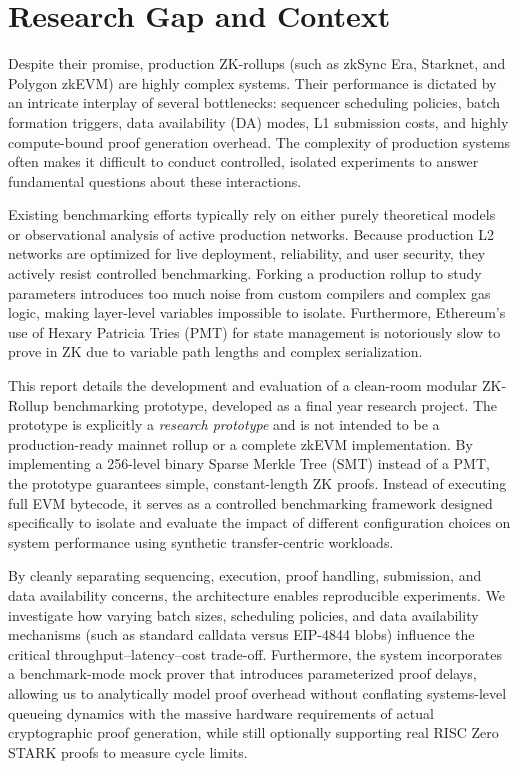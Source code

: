 \section{Research Gap and Context}
\label{sec:research_gap}

Despite their promise, production ZK-rollups (such as zkSync Era, Starknet, and Polygon zkEVM) are highly complex systems. Their performance is dictated by an intricate interplay of several bottlenecks: sequencer scheduling policies, batch formation triggers, data availability (DA) modes, L1 submission costs, and highly compute-bound proof generation overhead. The complexity of production systems often makes it difficult to conduct controlled, isolated experiments to answer fundamental questions about these interactions. 

Existing benchmarking efforts typically rely on either purely theoretical models or observational analysis of active production networks. Because production L2 networks are optimized for live deployment, reliability, and user security, they actively resist controlled benchmarking. Forking a production rollup to study parameters introduces too much noise from custom compilers and complex gas logic, making layer-level variables impossible to isolate. Furthermore, Ethereum's use of Hexary Patricia Tries (PMT) for state management is notoriously slow to prove in ZK due to variable path lengths and complex serialization. 

This report details the development and evaluation of a clean-room modular ZK-Rollup benchmarking prototype, developed as a final year research project. The prototype is explicitly a \textit{research prototype} and is not intended to be a production-ready mainnet rollup or a complete zkEVM implementation. By implementing a 256-level binary Sparse Merkle Tree (SMT) instead of a PMT, the prototype guarantees simple, constant-length ZK proofs. Instead of executing full EVM bytecode, it serves as a controlled benchmarking framework designed specifically to isolate and evaluate the impact of different configuration choices on system performance using synthetic transfer-centric workloads.

By cleanly separating sequencing, execution, proof handling, submission, and data availability concerns, the architecture enables reproducible experiments. We investigate how varying batch sizes, scheduling policies, and data availability mechanisms (such as standard calldata versus EIP-4844 blobs) influence the critical throughput--latency--cost trade-off. Furthermore, the system incorporates a benchmark-mode mock prover that introduces parameterized proof delays, allowing us to analytically model proof overhead without conflating systems-level queueing dynamics with the massive hardware requirements of actual cryptographic proof generation, while still optionally supporting real RISC Zero STARK proofs to measure cycle limits.
